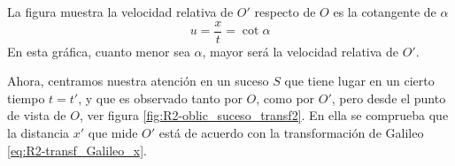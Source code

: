 La figura muestra la velocidad relativa de $O'$ respecto de $O$ es la cotangente de
$\alpha$
\begin{equation}
  \label{eq:R2-transfGalileo_u_alpha}
  u= \dfrac{x}{t} =\cot\alpha
\end{equation}
En esta gráfica, cuanto menor sea $\alpha$, mayor será la velocidad relativa de
$O'$\footnotemark{}.

Ahora, centramos nuestra atención en un suceso $S$ que tiene lugar en un cierto tiempo $t=t'$, y que es observado tanto por $O$, como por $O'$, pero desde el punto de vista
de $O$, ver figura \ref{fig:R2-oblic_suceso_transf2}.
En ella se comprueba que la distancia $x'$ que mide $O'$ está de acuerdo con la transformación de Galileo \eqref{eq:R2-transf_Galileo_x}.
